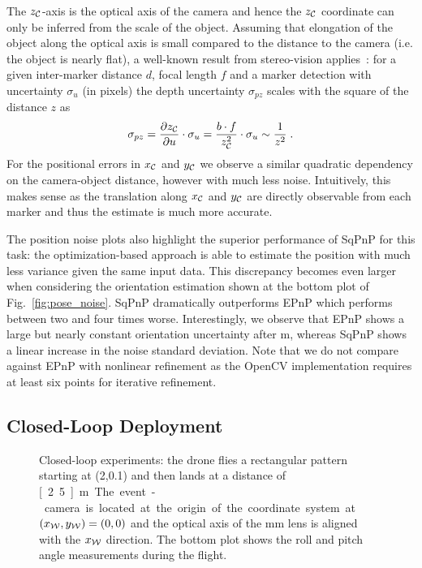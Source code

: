 The $z_{\mathcal{C}}$-axis is the optical axis of the camera and hence the $z_{\mathcal{C}}$ coordinate can only be inferred from the scale of the object. Assuming that elongation of the object along the optical axis is small compared to the distance to the camera (i.e. the object is nearly flat), a well-known result from stereo-vision applies~\cite{zisserman2004multipleview}: for a given inter-marker distance $d$, focal length $f$ and a marker detection with uncertainty $\sigma_u$ (in pixels) the depth uncertainty $\sigma_{pz}$ scales with the square of the distance $z$ as
\begin{equation}
    \sigma_{pz} = \frac{\partial z_{\mathcal{C}}}{\partial u} \cdot \sigma_u = \frac{b \cdot f}{z_{\mathcal{C}}^2} \cdot \sigma_u \sim \frac{1}{z^2}\;.
\end{equation}
For the positional errors in $x_{\mathcal{C}}$ and $y_{\mathcal{C}}$ we observe a similar quadratic dependency on the camera-object distance, however with much less noise. Intuitively, this makes sense as the translation along $x_{\mathcal{C}}$ and $y_{\mathcal{C}}$ are directly observable from each marker and thus the estimate is much more accurate.

The position noise plots also highlight the superior performance of SqPnP for this task: the optimization-based approach is able to estimate the position with much less variance given the same input data. This discrepancy becomes even larger when considering the orientation estimation shown at the bottom plot of Fig.~\ref{fig:pose_noise}. SqPnP dramatically outperforms EPnP which performs between two and four times worse. Interestingly, we observe that EPnP shows a large but nearly constant orientation uncertainty after \unit[2]{m}, whereas SqPnP shows a linear increase in the noise standard deviation. Note that we do not compare against EPnP with nonlinear refinement as the OpenCV implementation requires at least six points for iterative refinement.

\subsection{Closed-Loop Deployment}

\begin{figure}[t]
    \centering
    
    \vspace*{-18pt}
    \caption{Closed-loop experiments: the drone flies a rectangular pattern starting at (2,0.1) and then lands at a distance of \unit[2.5]{m}. The event-camera is located at the origin of the coordinate system at $(x_{\mathcal{W}}, y_{\mathcal{W}}) = (0,0)$ and the optical axis of the \unit[50]{mm} lens is aligned with the $x_{\mathcal{W}}$ direction. The bottom plot shows the roll and pitch angle measurements during the flight.}
    \label{fig:closed_loop}
\end{figure}

